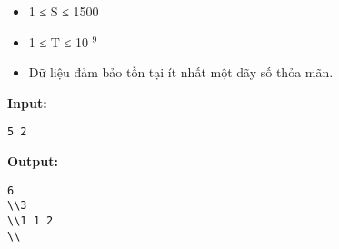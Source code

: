 \begin{itemize}
	\item     1 ≤ S ≤ 1500   
	\item     1 ≤ T ≤ 10    $^     9    $
	\item     Dữ liệu đảm bảo tồn tại ít nhất một dãy số thỏa mãn.   
\end{itemize}
\textbf{    Input:   }
\begin{verbatim}
5 2\end{verbatim}

\textbf{    Output:   }
\begin{verbatim}
6
\\3
\\1 1 2 
\\\end{verbatim}